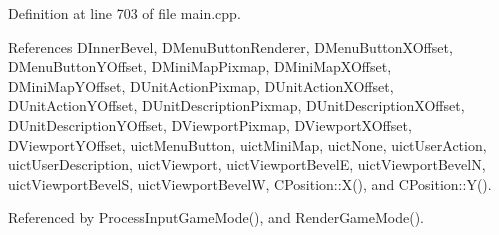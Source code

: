 Definition at line 703 of file main.\+cpp.



References D\+Inner\+Bevel, D\+Menu\+Button\+Renderer, D\+Menu\+Button\+X\+Offset, D\+Menu\+Button\+Y\+Offset, D\+Mini\+Map\+Pixmap, D\+Mini\+Map\+X\+Offset, D\+Mini\+Map\+Y\+Offset, D\+Unit\+Action\+Pixmap, D\+Unit\+Action\+X\+Offset, D\+Unit\+Action\+Y\+Offset, D\+Unit\+Description\+Pixmap, D\+Unit\+Description\+X\+Offset, D\+Unit\+Description\+Y\+Offset, D\+Viewport\+Pixmap, D\+Viewport\+X\+Offset, D\+Viewport\+Y\+Offset, uict\+Menu\+Button, uict\+Mini\+Map, uict\+None, uict\+User\+Action, uict\+User\+Description, uict\+Viewport, uict\+Viewport\+BevelE, uict\+Viewport\+BevelN, uict\+Viewport\+BevelS, uict\+Viewport\+BevelW, C\+Position\+::\+X(), and C\+Position\+::\+Y().



Referenced by Process\+Input\+Game\+Mode(), and Render\+Game\+Mode().



